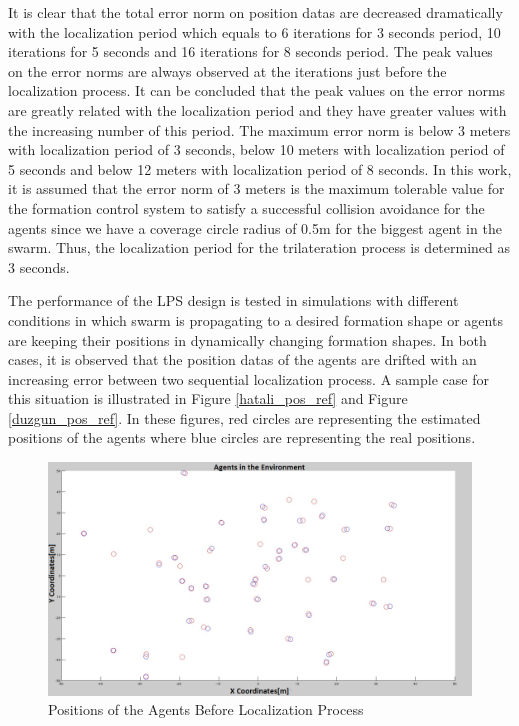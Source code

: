 It is clear that the total error norm on position datas are decreased dramatically with the localization period which equals to 6 iterations for 3 seconds period, 10 iterations for 5 seconds and 16 iterations for 8 seconds period. The peak values on the error norms are always observed at the iterations just before the localization process. It can be concluded that the peak values on the error norms are greatly related with the localization period and they have greater values with the increasing number of this period. The maximum error norm is below 3 meters with localization period of 3 seconds, below 10 meters with localization period of 5 seconds and below 12 meters with localization period of 8 seconds. In this work, it is assumed that the error norm of 3 meters is the maximum tolerable value for the formation control system to satisfy a successful collision avoidance for the agents since we have a coverage circle radius of 0.5m for the biggest agent in the swarm. Thus, the localization period for the trilateration process is determined as 3 seconds. 

The performance of the LPS design is tested in simulations with different conditions in which swarm is propagating to a desired formation shape or agents are keeping their positions in dynamically changing formation shapes.  In both cases, it is observed that the position datas of the agents are drifted with an increasing error between two  sequential localization process. A sample case for this situation is illustrated in Figure \ref{hatali_pos_ref} and Figure \ref{duzgun_pos_ref}. In these figures, red circles are representing the estimated positions of the agents where blue circles are representing the real positions. 

\begin{figure}[H]
\centering
\captionsetup{format=hang,justification=centerfirst}
\caption{Positions of the Agents Before Localization Process} \label{hatali_pos_ref}
\centerline{
\includegraphics[scale = 0.35]{Pozisyon_1_Hatali}}
\label{fig:lps}
\end{figure}

